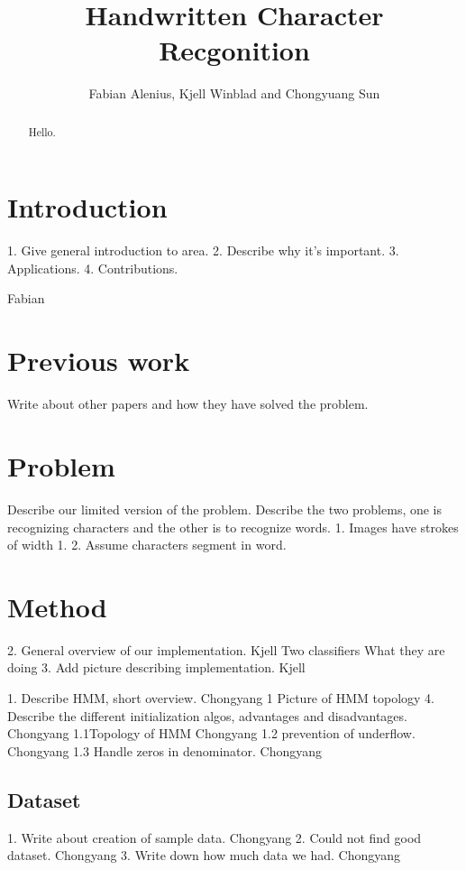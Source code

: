 \documentclass[11pt]{article}
\author{Fabian Alenius, Kjell Winblad and Chongyuang Sun} \title{Handwritten Character Recgonition}
\begin{document}
\maketitle

\begin{abstract}
Hello.

\end{abstract}

\section{Introduction}
1. Give general introduction to area.
2. Describe why it's important.
3. Applications.
4. Contributions.

\cite{trec}
Fabian


\section{Previous work}
Write about other papers and how they have solved the problem.

\section{Problem}
Describe our limited version of the problem.
Describe the two problems, one is recognizing characters and the other is to recognize words.
1. Images have strokes of width 1.
2. Assume characters segment in word.

\section{Method}
2. General overview of our implementation.   Kjell
	Two classifiers
		What they are doing
3. Add picture describing implementation.  Kjell

1. Describe HMM, short overview. Chongyang
1 Picture of HMM topology
4. Describe the different initialization algos, advantages and disadvantages. Chongyang
1.1Topology of HMM Chongyang
1.2 prevention of underflow. Chongyang
1.3 Handle zeros in denominator. Chongyang 




\subsection{Dataset}\label{sec:dataset}
1. Write about creation of sample data. Chongyang
2. Could not find good dataset. Chongyang
3. Write down how much data we had. Chongyang
\end{document}
